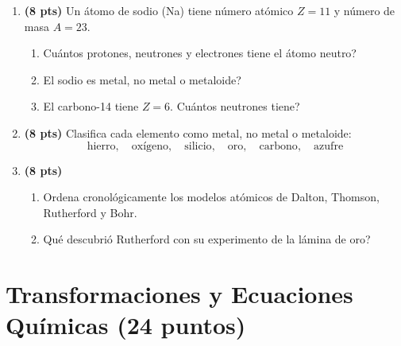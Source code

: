 \documentclass[12pt, letterpaper]{article}
\begin{document}
\begin{enumerate}[leftmargin=*]
  \item \textbf{(8 pts)} Un átomo de sodio (Na) tiene número atómico $Z = 11$ y número de masa $A = 23$.
        \begin{enumerate}[label=\alph*)]
          \item \textquestiondown Cuántos protones, neutrones y electrones tiene el átomo neutro?
          \item \textquestiondown El sodio es metal, no metal o metaloide?
          \item El carbono-14 tiene $Z = 6$. \textquestiondown Cuántos neutrones tiene?
        \end{enumerate}

  \item \textbf{(8 pts)} Clasifica cada elemento como metal, no metal o metaloide:
        \[
          \text{hierro}, \quad \text{oxígeno}, \quad \text{silicio}, \quad \text{oro}, \quad \text{carbono}, \quad \text{azufre}
        \]

  \item \textbf{(8 pts)}
        \begin{enumerate}[label=\alph*)]
          \item Ordena cronológicamente los modelos atómicos de Dalton, Thomson, Rutherford y Bohr.
          \item \textquestiondown Qué descubrió Rutherford con su experimento de la lámina de oro?
        \end{enumerate}
\end{enumerate}

\newpage

\section{Transformaciones y Ecuaciones Químicas (24 puntos)}
\end{document}
